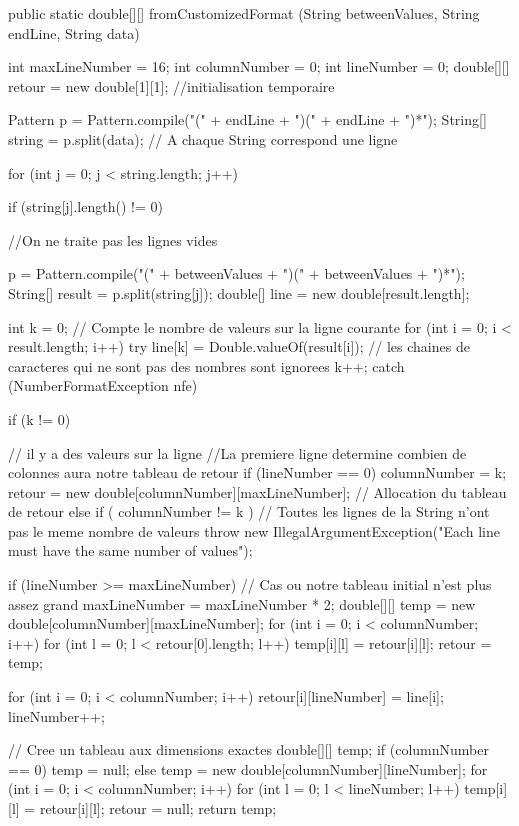 \begin{code}

   public static double[][] fromCustomizedFormat (String betweenValues,
                                           String endLine, String data) \begin{hide} {
      int maxLineNumber = 16;
      int columnNumber = 0;
      int lineNumber = 0;
      double[][] retour = new double[1][1]; //initialisation temporaire

      Pattern p = Pattern.compile("(" + endLine + ")(" + endLine + ")*");
      String[] string = p.split(data); // A chaque String correspond une ligne

      for (int j = 0; j < string.length; j++) {
         if (string[j].length() != 0) {
            //On ne traite pas les lignes vides

            p = Pattern.compile("(" + betweenValues + ")(" + betweenValues + ")*");
            String[] result = p.split(string[j]);
            double[] line = new double[result.length];

            int k = 0; // Compte le nombre de valeurs sur la ligne courante
            for (int i = 0; i < result.length; i++) {
               try {
                  line[k] = Double.valueOf(result[i]);   // les chaines de caracteres qui ne sont pas des nombres sont ignorees
                  k++;
               } catch (NumberFormatException nfe) {}
            }

            if (k != 0) { // il y a des valeurs sur la ligne
               //La premiere ligne determine combien de colonnes aura notre tableau de retour
               if (lineNumber == 0) {
                  columnNumber = k;
                  retour = new double[columnNumber][maxLineNumber]; // Allocation du tableau de retour
               } else if ( columnNumber != k ) // Toutes les lignes de la String n'ont pas le meme nombre de valeurs
                  throw new IllegalArgumentException("Each line must have the same number of values");

               if (lineNumber >= maxLineNumber) { // Cas ou notre tableau initial n'est plus assez grand
                  maxLineNumber = maxLineNumber * 2;
                  double[][] temp = new double[columnNumber][maxLineNumber];
                  for (int i = 0; i < columnNumber; i++)
                     for (int l = 0; l < retour[0].length; l++)
                        temp[i][l] = retour[i][l];
                  retour = temp;
               }

               for (int i = 0; i < columnNumber; i++)
                  retour[i][lineNumber] = line[i];
               lineNumber++;
            }
         }
      }
      // Cree un tableau aux dimensions exactes
      double[][] temp;
      if (columnNumber == 0)
         temp = null;
      else
         temp = new double[columnNumber][lineNumber];
      for (int i = 0; i < columnNumber; i++)
         for (int l = 0; l < lineNumber; l++)
            temp[i][l] = retour[i][l];
      retour = null;
      return temp;
   }\end{hide}
\end{code}
